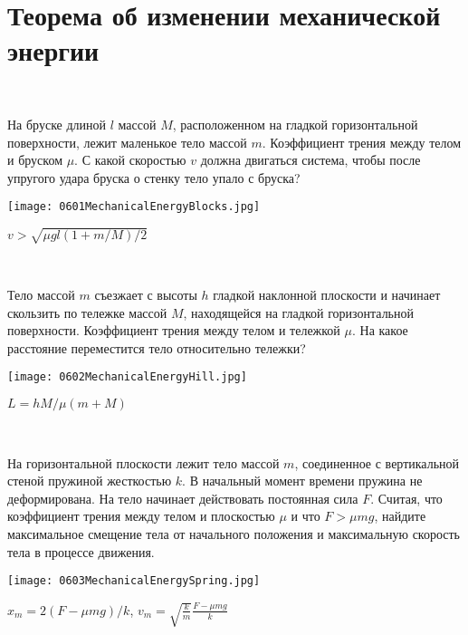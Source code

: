\section{Теорема об изменении механической энергии}

\begin{ex}
\hspace{0pt} \\
\begin{minipage}{.65\textwidth}
На бруске длиной $l$ массой $M$, расположенном на гладкой горизонтальной поверхности, лежит маленькое тело массой $m$. Коэффициент трения между телом и бруском $\mu$. С какой скоростью $v$ должна двигаться система, чтобы после упругого удара бруска о стенку тело упало с бруска?
\end{minipage}
\begin{minipage}{.35\textwidth}
\centering
\texttt{[image: 0601MechanicalEnergyBlocks.jpg]}
\end{minipage}
\begin{ans}
$v > \sqrt{\mu g l(1+m/M)/2}$
\end{ans}
\end{ex}

\begin{ex}
\hspace{0pt} \\
\begin{minipage}{.65\textwidth}
Тело массой $m$ съезжает с высоты $h$ гладкой наклонной плоскости и начинает скользить по тележке массой $M$, находящейся на гладкой горизонтальной поверхности. Коэффициент трения между телом и тележкой $\mu$. На какое расстояние переместится тело относительно тележки?
\end{minipage}
\begin{minipage}{.35\textwidth}
\centering
\texttt{[image: 0602MechanicalEnergyHill.jpg]}
\end{minipage}
\begin{ans}
$L = hM/\mu(m+M)$
\end{ans}
\end{ex}

\begin{ex}
\hspace{0pt} \\
\begin{minipage}{.65\textwidth}
На горизонтальной плоскости лежит тело массой $m$, соединенное с вертикальной стеной пружиной жесткостью $k$. В начальный момент времени пружина не деформирована. На тело начинает действовать постоянная сила $F$. Считая, что коэффициент трения между телом и плоскостью $\mu$ и что $F >\mu mg$, найдите максимальное смещение тела от начального положения и максимальную скорость тела в процессе движения.
\end{minipage}
\begin{minipage}{.35\textwidth}
\centering
\texttt{[image: 0603MechanicalEnergySpring.jpg]}
\end{minipage}
\begin{ans}
$x_m = 2(F-\mu mg)/k$, $v_m = \sqrt{\frac{k}{m}}\frac{F-\mu mg}{k}$
\end{ans}
\end{ex}

